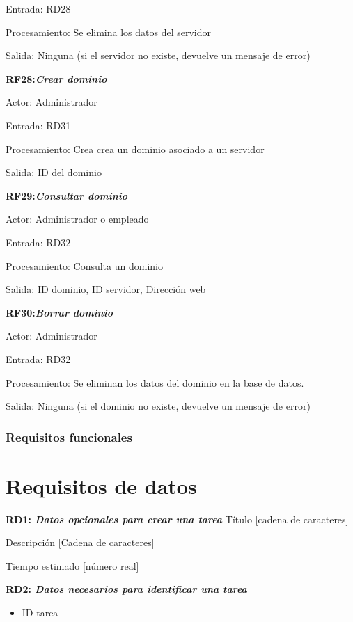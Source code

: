 \documentclass[paper=a4, fontsize=11pt, spanish]{scrartcl}
\begin{document}
Entrada: RD28

Procesamiento: Se elimina los datos del servidor

Salida: Ninguna  (si el servidor no existe, devuelve un mensaje de error)

\setlength{\parindent}{0em}
\textbf{RF28:\textit{Crear dominio}}
\setlength{\parindent}{3em}

Actor: Administrador

Entrada: RD31

Procesamiento: Crea crea un dominio asociado a un servidor

Salida: ID del dominio

\setlength{\parindent}{0em}
\textbf{RF29:\textit{Consultar dominio}}
\setlength{\parindent}{3em}

Actor: Administrador o empleado

Entrada: RD32

Procesamiento: Consulta un dominio

Salida: ID dominio, ID servidor, Dirección web

\setlength{\parindent}{0em}
\textbf{RF30:\textit{Borrar dominio}}
\setlength{\parindent}{3em}

Actor: Administrador

Entrada: RD32

Procesamiento: Se eliminan los datos del dominio en la base de datos.

Salida: Ninguna  (si el dominio no existe, devuelve un mensaje de error)

\subsubsection{Requisitos funcionales}

\section{Requisitos de datos}
\setlength{\parindent}{0em}
\textbf{RD1: \textit{Datos opcionales para crear una tarea}}
\setlength{\parindent}{2em}
Título [cadena de caracteres]

Descripción [Cadena de caracteres]

Tiempo estimado [número real]

\setlength{\parindent}{0em}
\textbf{RD2: \textit{Datos necesarios para identificar una tarea}}
\setlength{\parindent}{2em}
\begin{itemize}
\item ID tarea
\end{itemize}
\end{document}
